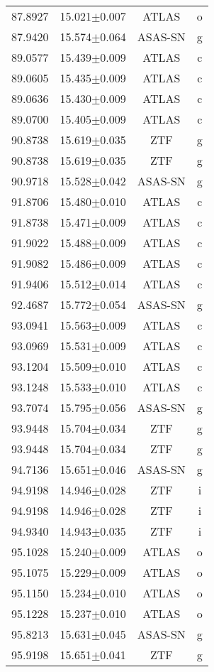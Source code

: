 \begin{table}
\begin{tabular}{cccc}
87.8927 & 15.021$\pm$0.007 & ATLAS & o \\
87.9420 & 15.574$\pm$0.064 & ASAS-SN & g \\
89.0577 & 15.439$\pm$0.009 & ATLAS & c \\
89.0605 & 15.435$\pm$0.009 & ATLAS & c \\
89.0636 & 15.430$\pm$0.009 & ATLAS & c \\
89.0700 & 15.405$\pm$0.009 & ATLAS & c \\
90.8738 & 15.619$\pm$0.035 & ZTF & g \\
90.8738 & 15.619$\pm$0.035 & ZTF & g \\
90.9718 & 15.528$\pm$0.042 & ASAS-SN & g \\
91.8706 & 15.480$\pm$0.010 & ATLAS & c \\
91.8738 & 15.471$\pm$0.009 & ATLAS & c \\
91.9022 & 15.488$\pm$0.009 & ATLAS & c \\
91.9082 & 15.486$\pm$0.009 & ATLAS & c \\
91.9406 & 15.512$\pm$0.014 & ATLAS & c \\
92.4687 & 15.772$\pm$0.054 & ASAS-SN & g \\
93.0941 & 15.563$\pm$0.009 & ATLAS & c \\
93.0969 & 15.531$\pm$0.009 & ATLAS & c \\
93.1204 & 15.509$\pm$0.010 & ATLAS & c \\
93.1248 & 15.533$\pm$0.010 & ATLAS & c \\
93.7074 & 15.795$\pm$0.056 & ASAS-SN & g \\
93.9448 & 15.704$\pm$0.034 & ZTF & g \\
93.9448 & 15.704$\pm$0.034 & ZTF & g \\
94.7136 & 15.651$\pm$0.046 & ASAS-SN & g \\
94.9198 & 14.946$\pm$0.028 & ZTF & i \\
94.9198 & 14.946$\pm$0.028 & ZTF & i \\
94.9340 & 14.943$\pm$0.035 & ZTF & i \\
95.1028 & 15.240$\pm$0.009 & ATLAS & o \\
95.1075 & 15.229$\pm$0.009 & ATLAS & o \\
95.1150 & 15.234$\pm$0.010 & ATLAS & o \\
95.1228 & 15.237$\pm$0.010 & ATLAS & o \\
95.8213 & 15.631$\pm$0.045 & ASAS-SN & g \\
95.9198 & 15.651$\pm$0.041 & ZTF & g \\

\end{tabular}
\end{table}
